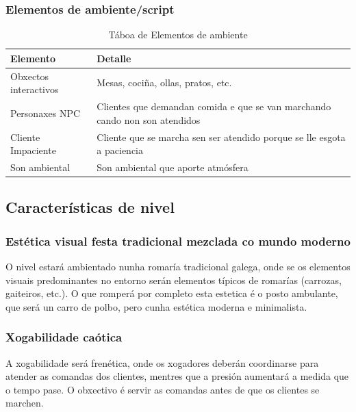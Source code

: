 \documentclass{report}  %
\begin{document}
\clearpage

\subsubsection{Elementos de ambiente/script}
\begin{table}[h]
    \centering
    \renewcommand{\arraystretch}{1.3} %
    \setlength{\tabcolsep}{10pt} %
    \label{tab:elementos}
    \begin{tabular}{|p{4cm}|p{9cm}|}
        \hline
        \rowcolor{octopus} %
        \textbf{Elemento}  & \textbf{Detalle} \\
        \hline
        Obxectos interactivos & Mesas, cociña, ollas, pratos, etc. \\
        \hline
        Personaxes NPC & Clientes que demandan comida e que se van marchando cando non son atendidos \\
        \hline
        Cliente Impaciente & Cliente que se marcha sen ser atendido porque se lle esgota a paciencia \\
        \hline
        Son ambiental & Son ambiental que aporte atmósfera \\
        \hline
    \end{tabular}
    \caption{Táboa de Elementos de ambiente}
\end{table}



\subsection{Características de nivel}

\subsubsection{Estética visual festa tradicional mezclada co mundo moderno}
O nivel estará ambientado nunha romaría tradicional galega, onde se os elementos visuais predominantes no 
entorno serán elementos típicos de romarías (carrozas, gaiteiros, etc.). O que romperá por completo esta estetica é o posto ambulante, que será un carro de polbo, pero cunha estética moderna e minimalista.

\subsubsection{Xogabilidade caótica}
A xogabilidade será frenética, onde os xogadores deberán coordinarse para atender as comandas dos clientes, mentres que a presión aumentará a medida que o tempo pase. O obxectivo é servir as comandas antes de que os clientes se marchen.
\end{document}
